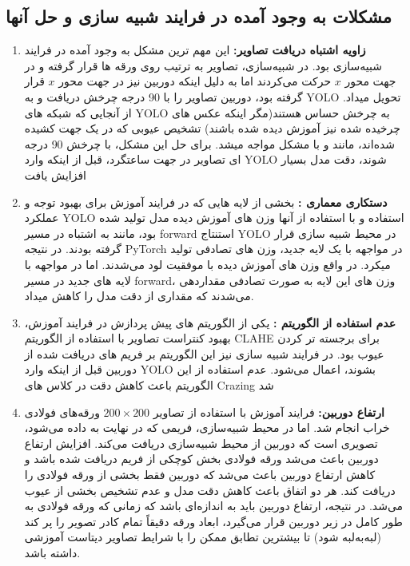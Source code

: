 \documentclass[a4paper, 10pt, twocolumn]{article}
\begin{document}
	\subsection{مشکلات به وجود آمده در فرایند شبیه سازی و حل آنها}
	\begin{enumerate}
		\item \textbf{زاویه اشتباه دریافت تصاویر: }این مهم ترین مشکل به وجود آمده در فرایند شبیه‌سازی بود. در شبیه‌سازی، تصاویر به ترتیب روی ورقه ها قرار گرفته و در جهت محور $x$ حرکت می‌کردند اما به دلیل اینکه دوربین نیز در جهت محور $x$ قرار گرفته بود، دوربین تصاویر را با 90 درجه چرخش دریافت و به YOLO تحویل میداد. از آنجایی که شبکه های YOLO به چرخش حساس هستند(مگر اینکه عکس های چرخیده شده نیز آموزش دیده شده باشند) تشخیص عیوبی که در یک جهت کشیده شده‌اند، مانند  و  با مشکل مواجه میشد. برای حل این مشکل، با چرخش 90 درجه ای تصاویر در جهت ساعتگرد، قبل از اینکه وارد YOLO شوند، دقت مدل بسیار افزایش یافت
		\item \textbf{دستکاری معماری :} بخشی از لایه هایی که در فرایند آموزش برای بهبود توجه و عملکرد YOLO استفاده و با استفاده از آنها وزن های آموزش دیده مدل تولید شده بود، مانند  به اشتباه در مسیر forward استنتاج YOLO در محیط شبیه سازی قرار گرفته بودند. در نتیجه PyTorch در مواجهه با یک لایه جدید، وزن های تصادفی تولید میکرد. در واقع وزن های آموزش دیده با موفقیت لود می‌شدند. اما در مواجهه با لایه های جدید در مسیر forward، وزن های این لایه به صورت تصادفی مقداردهی می‌شدند که مقداری از دقت مدل را کاهش میداد.
		\item \textbf{عدم استفاده از الگوریتم :} یکی از الگوریتم های پیش پردازش در فرایند آموزش، بهبود کنتراست تصاویر با استفاده از الگوریتم CLAHE برای برجسته تر کردن عیوب بود. در فرایند شبیه سازی نیز این الگوریتم بر فریم های دریافت شده از دوربین قبل از اینکه وارد YOLO بشوند، اعمال می‌شود. عدم استفاده از این الگوریتم باعث کاهش دقت در کلاس های Crazing  شد
		\item \textbf{ارتفاع دوربین:} فرایند آموزش با استفاده از تصاویر $200\times200$ ورقه‌های فولادی خراب انجام شد. اما در محیط شبیه‌سازی، فریمی که در نهایت به  داده می‌شود، تصویری است که دوربین از محیط شبیه‌سازی دریافت می‌کند. افزایش ارتفاع دوربین باعث می‌شد ورقه فولادی بخش کوچکی از فریم دریافت شده باشد و کاهش ارتفاع دوربین باعث می‌شد که دوربین فقط بخشی از ورقه فولادی را دریافت کند. هر دو اتفاق باعث کاهش دقت مدل و عدم تشخیص بخشی از عیوب می‌شد. در نتیجه، ارتفاع دوربین باید به اندازه‌ای باشد که زمانی که ورقه فولادی به طور کامل در زیر دوربین قرار می‌گیرد، ابعاد ورقه دقیقاً تمام کادر تصویر را پر کند (لبه‌به‌لبه شود)  تا بیشترین تطابق ممکن را با شرایط تصاویر دیتاست آموزشی داشته باشد.

\end{enumerate}
\end{document}
